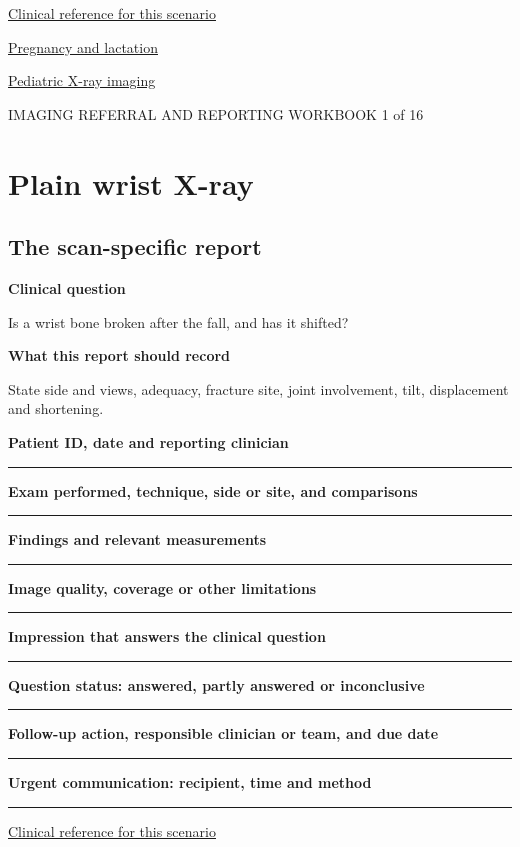 \documentclass[11pt,a4paper]{article}
\newcommand{\record}[1]{\textbf{#1}\par\vspace{0.55\baselineskip}\hrule\vspace{0.35\baselineskip}}
\begin{document}
\small\href{https://www.radiologyinfo.org/en/info/acs-acute-hand-and-wrist-trauma}{Clinical reference for this scenario}

\quad\href{https://pubmed.ncbi.nlm.nih.gov/28937575/}{Pregnancy and lactation}

\quad\href{https://www.fda.gov/radiation-emitting-products/medical-imaging/pediatric-x-ray-imaging}{Pediatric X-ray imaging}

\normalsize

\newpage

{\small IMAGING REFERRAL AND REPORTING WORKBOOK \hfill 1 of 16}

\section*{Plain wrist X-ray}

\subsection*{The scan-specific report}

\textbf{Clinical question}\par Is a wrist bone broken after the fall, and has it shifted?\par

\textbf{What this report should record}\par State side and views, adequacy, fracture site, joint involvement, tilt, displacement and shortening.\par

\record{Patient ID, date and reporting clinician}

\record{Exam performed, technique, side or site, and comparisons}

\record{Findings and relevant measurements}

\record{Image quality, coverage or other limitations}

\record{Impression that answers the clinical question}

\record{Question status: answered, partly answered or inconclusive}

\record{Follow-up action, responsible clinician or team, and due date}

\record{Urgent communication: recipient, time and method}

\small\href{https://www.radiologyinfo.org/en/info/acs-acute-hand-and-wrist-trauma}{Clinical reference for this scenario}

\normalsize
\end{document}
